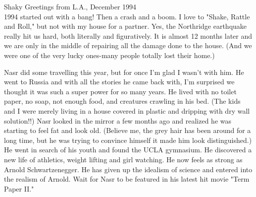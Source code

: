 
%

Shaky Greetings from L.A., \hfill December 1994\\

1994 started out with a bang! Then a crash and a boom. I love to "Shake, Rattle and Roll," but not with my house for a partner. Yes, the
Northridge earthquake really hit us hard, both literally and figuratively. It is almost 12 months later and we are only in the middle of
repairing all the damage done to the house. (And we were one of the very lucky ones-many people totally lost their home.)

Nasr did some travelling this year, but for once I'm glad I wasn't with him. He went to Russia and with all the stories he came back with, I'm
surprised we thought it was such a super power for so many years. He lived with no toilet paper, no soap, not enough food, and creatures
crawling in his bed. (The kids and I were merely living in a house covered in plastic and dripping with dry wall solution!!) Nasr looked in the
mirror a few months ago and realized he was starting to feel fat and look old. (Believe me, the grey hair has been around for a long time, but
he was trying to convince himself it made him look distinguished.) He went in search of his youth and found the UCLA gymnasium. He discovered a
new life of athletics, weight lifting and girl watching. He now feels as strong as Arnold Schwartzenegger. He has given up the idealism of
science and entered into the realism of Arnold. Wait for Nasr to be featured in his latest hit movie "Term Paper II."


